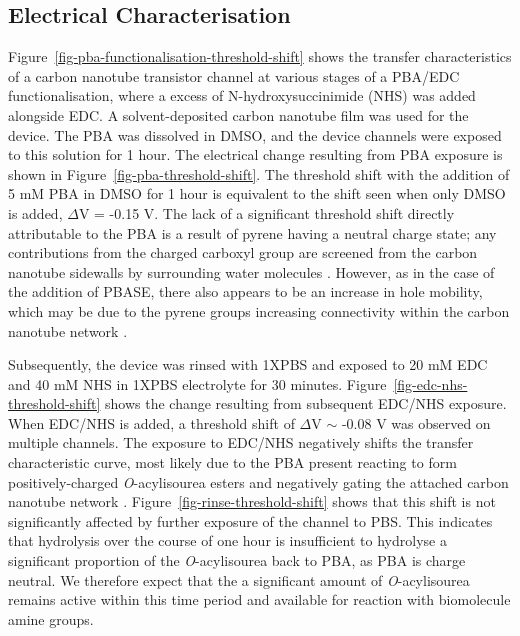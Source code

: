 \documentclass[
  a4paper,
]{scrbook}
\begin{document}
\hypertarget{electrical-characterisation-1}{%
\subsection{Electrical
Characterisation}\label{electrical-characterisation-1}}

Figure~\ref{fig-pba-functionalisation-threshold-shift} shows the
transfer characteristics of a carbon nanotube transistor channel at
various stages of a PBA/EDC functionalisation, where a excess of
N-hydroxysuccinimide (NHS) was added alongside EDC. A solvent-deposited
carbon nanotube film was used for the device. The PBA was dissolved in
DMSO, and the device channels were exposed to this solution for 1 hour.
The electrical change resulting from PBA exposure is shown in
Figure~\ref{fig-pba-threshold-shift}. The threshold shift with the
addition of 5 mM PBA in DMSO for 1 hour is equivalent to the shift seen
when only DMSO is added, \(\Delta\)V = -0.15 V. The lack of a
significant threshold shift directly attributable to the PBA is a result
of pyrene having a neutral charge state; any contributions from the
charged carboxyl group are screened from the carbon nanotube sidewalls
by surrounding water molecules \autocite{Lerner2012}. However, as in the
case of the addition of PBASE, there also appears to be an increase in
hole mobility, which may be due to the pyrene groups increasing
connectivity within the carbon nanotube network
\autocite{Murugathas2019b}.

Subsequently, the device was rinsed with 1XPBS and exposed to 20 mM EDC
and 40 mM NHS in 1XPBS electrolyte for 30 minutes.
Figure~\ref{fig-edc-nhs-threshold-shift} shows the change resulting from
subsequent EDC/NHS exposure. When EDC/NHS is added, a threshold shift of
\(\Delta\)V \(\sim\) -0.08 V was observed on multiple channels. The
exposure to EDC/NHS negatively shifts the transfer characteristic curve,
most likely due to the PBA present reacting to form positively-charged
\emph{O}-acylisourea esters and negatively gating the attached carbon
nanotube network \autocite{Heller2008,Hermanson2013-4}.
Figure~\ref{fig-rinse-threshold-shift} shows that this shift is not
significantly affected by further exposure of the channel to PBS. This
indicates that hydrolysis over the course of one hour is insufficient to
hydrolyse a significant proportion of the \emph{O}-acylisourea back to
PBA, as PBA is charge neutral. We therefore expect that the a
significant amount of \emph{O}-acylisourea remains active within this
time period and available for reaction with biomolecule amine groups.
\end{document}
